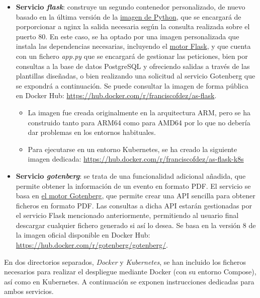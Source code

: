 \documentclass{report}
\begin{document}
\begin{itemize}
\begin{itemize}
            \end{itemize}
            \item \textbf{Servicio \textit{flask}}: construye un segundo contenedor personalizado, de nuevo basado en la última versión de la \href{https://hub.docker.com/_/python}{imagen de Python}, que se encargará de porporcionar a nginx la salida necesaria según la consulta realizada sobre el puerto 80. En este caso, se ha optado por una imagen personalizada que instala las dependencias necesarias, incluyendo el \href{https://flask.palletsprojects.com/en/stable/}{motor Flask}, y que cuenta con un fichero \textit{app.py} que se encargará de gestionar las peticiones, bien por consultas a la base de datos PostgreSQL y ofreciendo salidas a través de las plantillas diseñadas, o bien realizando una solicitud al servicio Gotenberg que se expondrá a continuación. Se puede consultar la imagen de forma pública en Docker Hub: \url{https://hub.docker.com/r/franciscofdez/as-flask}.
            \begin{itemize}
                \item La imagen fue creada originalmente en la arquitectura ARM, pero se ha construido tanto para ARM64 como para AMD64 por lo que no debería dar problemas en los entornos habituales.
                \item Para ejecutarse en un entorno Kubernetes, se ha creado la siguiente imagen dedicada: \url{https://hub.docker.com/r/franciscofdez/as-flask-k8s}
            \end{itemize}
            \item \textbf{Servicio \textit{gotenberg}}: se trata de una funcionalidad adicional añadida, que permite obtener la información de un evento en formato PDF. El servicio se basa en \href{https://gotenberg.dev}{el motor Gotenberg}, que permite crear una API sencilla para obtener ficheros en formato PDF. Las consultas a dicha API estarán gestionadas por el servicio Flask mencionado anteriormente, permitiendo al usuario final descargar cualquier fichero generado si así lo desea. Se basa en la versión 8 de la imagen oficial disponible en Docker Hub: \url{https://hub.docker.com/r/gotenberg/gotenberg/}.
        \end{itemize}

        En dos directorios separados, \textit{Docker} y \textit{Kubernetes}, se han incluido los ficheros necesarios para realizar el despliegue mediante Docker (con su entorno Compose), así como en Kubernetes. A continuación se exponen instrucciones dedicadas para ambos servicios.
        
\end{document}
